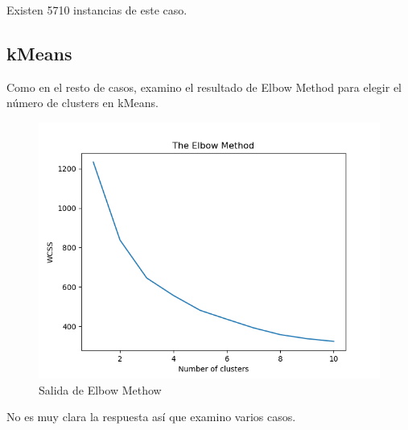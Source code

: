 Existen 5710 instancias de este caso.

\subsection{kMeans}

Como en el resto de casos, examino el resultado de Elbow Method para elegir el número de clusters en kMeans.

\begin{figure}[H] %
	\centering
	\includegraphics[scale=0.45]{em4.png}  %
	\caption{Salida de Elbow Methow} 
	\label{fig:em-caso4}
\end{figure}

No es muy clara la respuesta así que examino varios casos.

